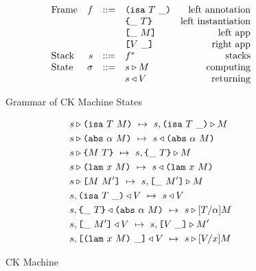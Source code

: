 \documentclass[../main.tex]{subfiles}
\begin{document}
\begin{figure*}
    \centering
    \[\begin{array}{lrclr}
        \textrm{Frame} & f  & ::= & \inAnnLeftFrame{T}                    & \textrm{left annotation}\\
                       &    &     & \inInstLeftFrame{T}                   & \textrm{left instantiation}\\
                       &    &     & \inAppLeftFrame{M}                    & \textrm{left app}\\
                       &    &     & \inAppRightFrame{V}                   & \textrm{right app}\\
        \textrm{Stack} & s      & ::= & f^*                               & \textrm{stacks}\\
        \textrm{State} & \sigma & ::= & \ckforward{s}{M}                  & \textrm{computing}\\
                       &        &     & \ckbackward{s}{V}                 & \textrm{returning}\\
    \end{array}\]
    
    \caption{Grammar of CK Machine States}
    \label{fig:Plutus_core_ck_frames}
\end{figure*}



\begin{figure*}[t]
    
    \begin{align*}
        &\cksteps{\ckforward{s}{\ann{M}{T}}}{\ckforward{s, \inAnnLeftFrame{T}}{M}}\\
        &\cksteps{\ckforward{s}{\abs{\alpha}{M}}}{\ckbackward{s}{\abs{\alpha}{M}}}\\
        &\cksteps{\ckforward{s}{\inst{M}{T}}}{\ckforward{s, \inInstLeftFrame{T}}{M}}\\
        &\cksteps{\ckforward{s}{\lam{x}{M}}}{\ckbackward{s}{\lam{x}{M}}}\\
        &\cksteps{\ckforward{s}{\app{M}{M'}}}{\ckforward{s, \inAppLeftFrame{M'}}{M}}\\
        &\cksteps{\ckbackward{s, \inAnnLeftFrame{T}}{V}}{\ckbackward{s}{V}}\\
        &\cksteps{\ckbackward{s, \inInstLeftFrame{T}}{\abs{\alpha}{M}}}{\ckforward{s}{\subst{T}{\alpha}{M}}}\\
        &\cksteps{\ckbackward{s, \inAppLeftFrame{M'}}{V}}{\ckforward{s, \inAppRightFrame{V}}{M'}}\\
        &\cksteps{\ckbackward{s, \inAppRightFrame{\lam{x}{M}}}{V}}{\ckforward{s}{\subst{V}{x}{M}}}\\
    \end{align*}
    
    \caption{CK Machine}
    \label{fig:Plutus_core_ck_machine}
\end{figure*}
\end{document}
